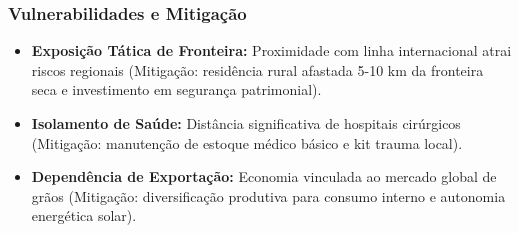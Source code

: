\subsubsection{Vulnerabilidades e
Mitigação}

\begin{itemize}
\tightlist
\item
  \textbf{Exposição Tática de Fronteira:} Proximidade com linha
  internacional atrai riscos regionais (Mitigação: residência rural
  afastada 5-10 km da fronteira seca e investimento em segurança
  patrimonial).
\item
  \textbf{Isolamento de Saúde:} Distância significativa de hospitais
  cirúrgicos (Mitigação: manutenção de estoque médico básico e kit
  trauma local).
\item
  \textbf{Dependência de Exportação:} Economia vinculada ao mercado
  global de grãos (Mitigação: diversificação produtiva para consumo
  interno e autonomia energética solar).
\end{itemize}

